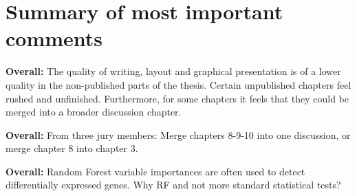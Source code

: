 \documentclass[10pt]{article}
\begin{document}
\section{Summary of most important comments}

\textbf{Overall:} The quality of writing, layout and graphical presentation is of a lower quality in the non-published parts of the thesis. Certain unpublished chapters feel rushed and unfinished. Furthermore, for some chapters it feels that they could be merged into a broader discussion chapter.

\textbf{Overall:} From three jury members: Merge chapters 8-9-10 into one discussion, or merge chapter 8 into chapter 3.

\textbf{Overall:} Random Forest variable importances are often used to detect differentially expressed genes. Why RF and not more standard statistical tests?
\end{document}

